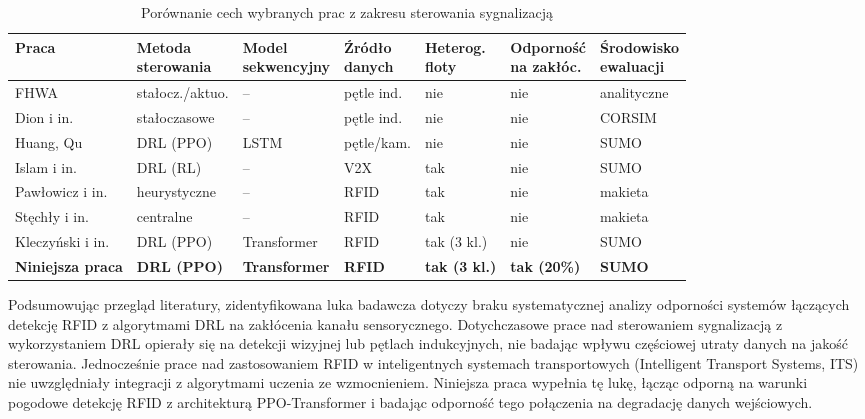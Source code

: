 \documentclass[10pt,a4paper]{article}
\begin{document}
\begin{table}[H]
\centering
\footnotesize
\setlength{\tabcolsep}{4pt}
\renewcommand{\arraystretch}{1.05}
\caption{Porównanie cech wybranych prac z zakresu sterowania sygnalizacją}
\label{tab:lit}
\begin{tabularx}{\textwidth}{@{}>{\raggedright\arraybackslash}X *{6}{>{\centering\arraybackslash}X}@{}}
\toprule
\textbf{Praca} & \makecell{\textbf{Metoda}\\\textbf{sterowania}} & \makecell{\textbf{Model}\\\textbf{sekwencyjny}} & \makecell{\textbf{Źródło}\\\textbf{danych}} & \makecell{\textbf{Heterog.}\\\textbf{floty}} & \makecell{\textbf{Odporność}\\\textbf{na zakłóc.}} & \makecell{\textbf{Środowisko}\\\textbf{ewaluacji}} \\
\midrule
FHWA~\cite{ref9} & stałocz./aktuo. & -- & pętle ind. & nie & nie & analityczne \\
Dion i in.~\cite{ref13} & stałoczasowe & -- & pętle ind. & nie & nie & CORSIM \\
Huang, Qu~\cite{ref14} & DRL (PPO) & LSTM & pętle/kam. & nie & nie & SUMO \\
Islam i in.~\cite{ref11} & DRL (RL) & -- & V2X & tak & nie & SUMO \\
Pawłowicz i in.~\cite{ref3} & heurystyczne & -- & RFID & tak & nie & makieta \\
Stęchły i in.~\cite{ref15} & centralne & -- & RFID & tak & nie & makieta \\
Kleczyński i in.~\cite{ref16} & DRL (PPO) & Transformer & RFID & tak (3 kl.) & nie & SUMO \\
\midrule
\textbf{Niniejsza praca} & \textbf{DRL (PPO)} & \textbf{Transformer} & \textbf{RFID} & \textbf{tak (3 kl.)} & \textbf{tak (20\%)} & \textbf{SUMO} \\
\bottomrule
\end{tabularx}
\end{table}

Podsumowując przegląd literatury, zidentyfikowana luka badawcza dotyczy braku systematycznej analizy odporności systemów łączących detekcję RFID z algorytmami DRL na zakłócenia kanału sensorycznego. Dotychczasowe prace nad sterowaniem sygnalizacją z wykorzystaniem DRL opierały się na detekcji wizyjnej lub pętlach indukcyjnych, nie badając wpływu częściowej utraty danych na jakość sterowania. Jednocześnie prace nad zastosowaniem RFID w inteligentnych systemach transportowych (Intelligent Transport Systems, ITS) nie uwzględniały integracji z algorytmami uczenia ze wzmocnieniem. Niniejsza praca wypełnia tę lukę, łącząc odporną na warunki pogodowe detekcję RFID z architekturą PPO-Transformer i badając odporność tego połączenia na degradację danych wejściowych.
\end{document}
